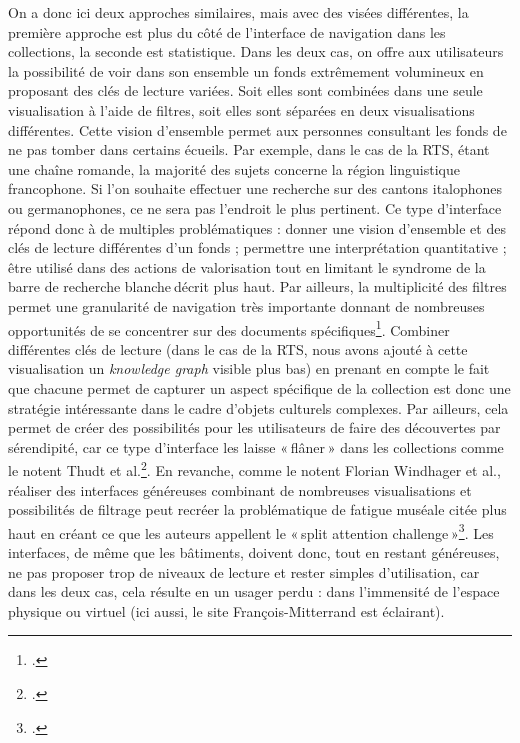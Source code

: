 On a donc ici deux approches similaires, mais avec des visées différentes, la première approche est plus du côté de l’interface de navigation dans les collections, la seconde est statistique. Dans les deux cas, on offre aux utilisateurs la possibilité de voir dans son ensemble un fonds extrêmement volumineux en proposant des clés de lecture variées. Soit elles sont combinées dans une seule visualisation à l’aide de filtres, soit elles sont séparées en deux visualisations différentes. Cette vision d'ensemble permet aux personnes consultant les fonds de ne pas tomber dans certains écueils. Par exemple, dans le cas de la RTS, étant une chaîne romande, la majorité des sujets concerne la région linguistique francophone. Si l'on souhaite effectuer une recherche sur des cantons italophones ou germanophones, ce ne sera pas l'endroit le plus pertinent. Ce type d’interface répond donc à de multiples problématiques : donner une vision d’ensemble et des clés de lecture différentes d’un fonds ; permettre une interprétation quantitative ; être utilisé dans des actions de valorisation tout en limitant le syndrome de la barre de recherche blanche décrit plus haut. Par ailleurs, la multiplicité des filtres permet une granularité de navigation très importante donnant de nombreuses opportunités de se concentrer sur des documents spécifiques\footcite[p. 7]{windhager2018a}. Combiner différentes clés de lecture (dans le cas de la RTS, nous avons ajouté à cette visualisation un \textit{knowledge graph} visible plus bas) en prenant en compte le fait que chacune permet de capturer un aspect spécifique de la collection est donc une stratégie intéressante dans le cadre d’objets culturels complexes. Par ailleurs, cela permet de créer des possibilités pour les utilisateurs de faire des découvertes par sérendipité, car ce type d’interface les laisse « flâner » dans les collections comme le notent Thudt et al.\footcite[(cité dans)]{windhager2018a}. En revanche, comme le notent Florian Windhager et al., réaliser des interfaces généreuses combinant de nombreuses visualisations et possibilités de filtrage peut recréer la problématique de fatigue muséale citée plus haut en créant ce que les auteurs appellent le « split attention challenge »\footcite[p. 9]{windhager2018a}. Les interfaces, de même que les bâtiments, doivent donc, tout en restant généreuses, ne pas proposer trop de niveaux de lecture et rester simples d’utilisation, car dans les deux cas, cela résulte en un usager perdu : dans l’immensité de l’espace physique ou virtuel (ici aussi, le site François-Mitterrand est éclairant).

